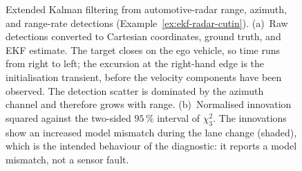 \begin{figure}[!t]
{
}
\caption{Extended Kalman filtering from automotive-radar
range, azimuth, and range-rate detections (Example~\ref{ex:ekf-radar-cutin}).
(a)~Raw detections converted to Cartesian coordinates, ground truth, and EKF
estimate. The target closes on the ego vehicle, so time runs from right to left;
the excursion at the right-hand edge is the initialisation transient, before the
velocity components have been observed. The detection scatter is dominated by
the azimuth channel and therefore grows with range. (b)~Normalised innovation
squared against the two-sided $95\,\%$ interval of $\chi^{2}_{3}$. The innovations show an increased model mismatch during the lane change (shaded), which is the intended behaviour of
the diagnostic: it reports a model mismatch, not a sensor fault.}
\label{fig:ekf-radar-cutin}
\end{figure}

